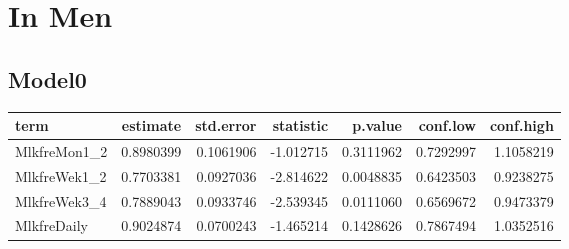 \documentclass[
]{article}
\newenvironment{Shaded}{\begin{snugshade}}{\end{snugshade}}
\newcommand{\DataTypeTok}[1]{\textcolor[rgb]{0.13,0.29,0.53}{#1}}
\newcommand{\KeywordTok}[1]{\textcolor[rgb]{0.13,0.29,0.53}{\textbf{#1}}}
\newcommand{\NormalTok}[1]{#1}
\newcommand{\OperatorTok}[1]{\textcolor[rgb]{0.81,0.36,0.00}{\textbf{#1}}}
\newcommand{\OtherTok}[1]{\textcolor[rgb]{0.56,0.35,0.01}{#1}}
\newcommand{\StringTok}[1]{\textcolor[rgb]{0.31,0.60,0.02}{#1}}
\begin{document}
\hypertarget{in-men}{%
\section{In Men}\label{in-men}}

\hypertarget{model0-1}{%
\subsection{Model0}\label{model0-1}}

\begin{Shaded}
\end{Shaded}

\begin{longtable}[]{@{}lrrrrrr@{}}
\toprule
term & estimate & std.error & statistic & p.value & conf.low &
conf.high\tabularnewline
\midrule
\endhead
MlkfreMon1\_2 & 0.8980399 & 0.1061906 & -1.012715 & 0.3111962 &
0.7292997 & 1.1058219\tabularnewline
MlkfreWek1\_2 & 0.7703381 & 0.0927036 & -2.814622 & 0.0048835 &
0.6423503 & 0.9238275\tabularnewline
MlkfreWek3\_4 & 0.7889043 & 0.0933746 & -2.539345 & 0.0111060 &
0.6569672 & 0.9473379\tabularnewline
MlkfreDaily & 0.9024874 & 0.0700243 & -1.465214 & 0.1428626 & 0.7867494
& 1.0352516\tabularnewline
\bottomrule
\end{longtable}

\begin{Shaded}
\end{Shaded}
\end{document}
